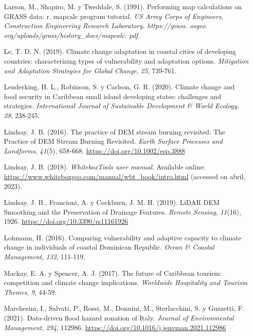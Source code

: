 \documentclass[spanish]{article}
\newlength{\cslhangindent}
\newlength{\cslentryspacingunit} %
\newenvironment{CSLReferences}[2] %
 {%
  \setlength{\parindent}{0pt}
  \ifodd #1
  \let\oldpar\par
  \def\par{\hangindent=\cslhangindent\oldpar}
  \fi
  \setlength{\parskip}{#2\cslentryspacingunit}
 }%
 {}
\begin{document}
\begin{CSLReferences}{1}{0}
\leavevmode{}%
Larson, M., Shapiro, M. y Tweddale, S. (1991). Performing map
calculations on GRASS data: r. mapcalc program tutorial. \emph{US Army
Corps of Engineers, Construction Engineering Research Laboratory.
https://grass. osgeo. org/uploads/grass/history{\_}docs/mapcalc. pdf}.

\leavevmode{}%
Le, T. D. N. (2019). Climate change adaptation in coastal cities of
developing countries: characterizing types of vulnerability and
adaptation options. \emph{Mitigation and Adaptation Strategies for
Global Change}, \emph{25}, 739-761.

\leavevmode{}%
Lenderking, H. L., Robinson, S. y Carlson, G. R. (2020). Climate change
and food security in Caribbean small island developing states:
challenges and strategies. \emph{International Journal of Sustainable
Development \& World Ecology}, \emph{28}, 238-245.

\leavevmode{}%
Lindsay, J. B. (2016). The practice of DEM stream burning revisited: The
Practice of DEM Stream Burning Revisited. \emph{Earth Surface Processes
and Landforms}, \emph{41}(5), 658-668.
\url{https://doi.org/10.1002/esp.3888}

\leavevmode{}%
Lindsay, J. B. (2018). \emph{{WhiteboxTools user manual}}. Available
online: \url{https://www.whiteboxgeo.com/manual/wbt_book/intro.html}
(accessed on abril, 2023).

\leavevmode{}%
Lindsay, J. B., Francioni, A. y Cockburn, J. M. H. (2019). LiDAR DEM
Smoothing and the Preservation of Drainage Features. \emph{Remote
Sensing}, \emph{11}(16), 1926. \url{https://doi.org/10.3390/rs11161926}

\leavevmode{}%
Lohmann, H. (2016). Comparing vulnerability and adaptive capacity to
climate change in individuals of coastal Dominican Republic. \emph{Ocean
\& Coastal Management}, \emph{132}, 111-119.

\leavevmode{}%
Mackay, E. A. y Spencer, A. J. (2017). The future of Caribbean tourism:
competition and climate change implications. \emph{Worldwide Hospitality
and Tourism Themes}, \emph{9}, 44-59.

\leavevmode{}%
Marchesini, I., Salvati, P., Rossi, M., Donnini, M., Sterlacchini, S. y
Guzzetti, F. (2021). Data-driven flood hazard zonation of Italy.
\emph{Journal of Environmental Management}, \emph{294}, 112986.
\url{https://doi.org/10.1016/j.jenvman.2021.112986}


\end{CSLReferences}
\end{document}
